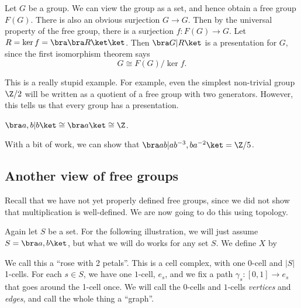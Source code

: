 \documentclass[a4paper]{article}
\begin{document}
\begin{eg}
  Let $G$ be a group. We can view the group as a set, and hence obtain a free group $F(G)$. There is also an obvious surjection $G \to G$. Then by the universal property of the free group, there is a surjection $f: F(G) \to G$. Let $R = \ker f = \bra \bra R\ket \ket$. Then $\bra G | R \ket$ is a presentation for $G$, since the first isomorphism theorem says
  \[
    G \cong F(G) / \ker f.
  \]
\end{eg}
This is a really stupid example. For example, even the simplest non-trivial group $\Z/2$ will be written as a quotient of a free group with two generators. However, this tells us that every group has a presentation.

\begin{eg}
  $\bra a, b|b \ket \cong \bra a\ket \cong \Z$.
\end{eg}

\begin{eg}
  With a bit of work, we can show that $\bra a b|ab^{-3}, ba^{-2}\ket = \Z/5$.
\end{eg}

\subsection{Another view of free groups}
Recall that we have not yet properly defined free groups, since we did not show that multiplication is well-defined. We are now going to do this using topology.

Again let $S$ be a set. For the following illustration, we will just assume $S = \bra a, b\ket$, but what we will do works for any set $S$. We define $X$ by
\begin{center}
\end{center}
We call this a ``rose with 2 petals''. This is a cell complex, with one $0$-cell and $|S|$ 1-cells. For each $s \in S$, we have one $1$-cell, $e_s$, and we fix a path $\gamma_s: [0, 1] \to e_s$ that goes around the 1-cell once. We will call the $0$-cells and $1$-cells \emph{vertices} and \emph{edges}, and call the whole thing a ``graph''.
\end{document}
